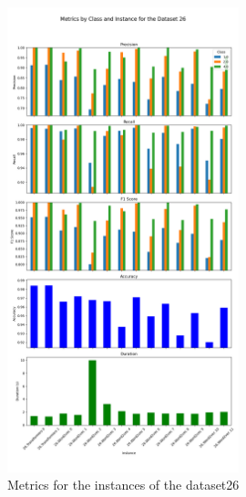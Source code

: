 \begin{figure}[H]
\centering
\includegraphics[width=0.6\textwidth]{img/annexes/26/26 - Metrics.png}
\caption{Metrics for the instances of the dataset26}
\label{fig:26_metrics_instance}
\end{figure}

